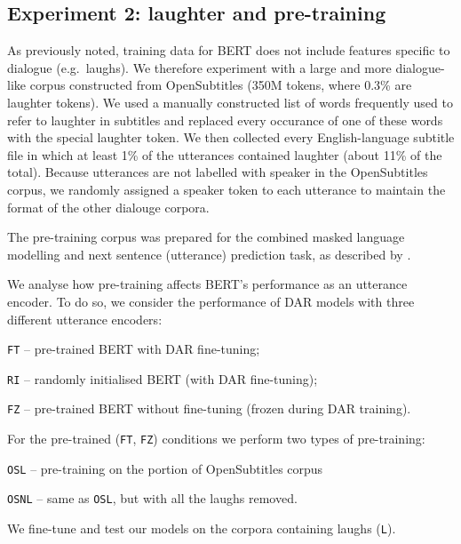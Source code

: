 \documentclass[11pt,a4paper]{article}
\begin{document}

\subsection{Experiment 2: laughter and pre-training}
\label{sec:exper-2:-laught}

As previously noted, training data for BERT does not include
features specific to dialogue (e.g.\ laughs). We therefore  experiment
with a large and more dialogue-like corpus constructed from
OpenSubtitles \citep{Lison2016} (350M tokens, where 0.3\% are laughter
tokens).  We used a manually constructed list of words frequently used
to refer to laughter in subtitles and replaced every occurance of one
of these words with the special laughter token.  We then collected
every English-language subtitle file in which at least 1\% of the
utterances contained laughter (about 11\% of the total).  Because
utterances are not labelled with speaker in the OpenSubtitles corpus,
we randomly assigned a speaker token to each utterance to maintain the
format of the other dialouge corpora.

The pre-training corpus was prepared for the combined masked language
modelling and next sentence (utterance) prediction task, as described
by \citet{devlinBERTPretrainingDeep2018}.

We analyse how pre-training affects BERT's performance as an utterance encoder.
To do so, we consider the performance of DAR models with three different utterance encoders:
\begin{enumerate*}[i)]
\item \texttt{FT} -- pre-trained BERT with DAR fine-tuning;
\item \texttt{RI} -- randomly initialised BERT (with DAR fine-tuning);
\item \texttt{FZ} -- pre-trained BERT without fine-tuning (frozen during DAR training).
\end{enumerate*}
For the pre-trained (\texttt{FT}, \texttt{FZ}) conditions we perform two types of
pre-training:
\begin{enumerate*}[i)]
\item \texttt{OSL} -- pre-training on the portion of OpenSubtitles corpus
\item \texttt{OSNL} -- same as \texttt{OSL}, but with all the laughs removed.
\end{enumerate*}
We fine-tune and test our models on the corpora containing laughs (\texttt{L}).
\end{document}
